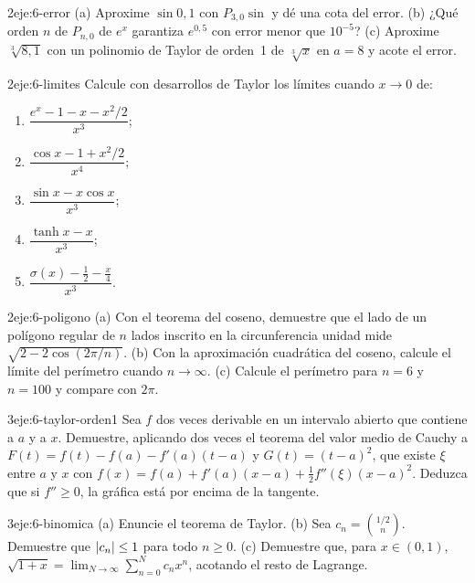 \begin{ejercicio}{2}{eje:6-error}
(a) Aproxime $\sin 0{,}1$ con $P_{3,0}\sin$ y dé una cota del error. (b) ¿Qué orden $n$ de $P_{n,0}$ de $e^{x}$ garantiza $e^{0{,}5}$ con error menor que $10^{-5}$? (c) Aproxime $\sqrt[3]{8{,}1}$ con un polinomio de Taylor de orden~1 de $\sqrt[3]{x}$ en $a=8$ y acote el error.
\end{ejercicio}

\begin{ejercicio}{2}{eje:6-limites}
Calcule con desarrollos de Taylor los límites cuando $x\to0$ de:
\begin{enumerate}[label=(\alph*)]
  \item $\dfrac{e^{x}-1-x-x^{2}/2}{x^{3}}$;
  \item $\dfrac{\cos x-1+x^{2}/2}{x^{4}}$;
  \item $\dfrac{\sin x-x\cos x}{x^{3}}$;
  \item $\dfrac{\tanh x-x}{x^{3}}$;
  \item $\dfrac{\sigma(x)-\tfrac12-\tfrac x4}{x^{3}}$.
\end{enumerate}
\end{ejercicio}

\begin{ejercicio}{2}{eje:6-poligono}
(a) Con el teorema del coseno, demuestre que el lado de un polígono regular de $n$ lados inscrito en la circunferencia unidad mide $\sqrt{2-2\cos(2\pi/n)}$. (b) Con la aproximación cuadrática del coseno, calcule el límite del perímetro cuando $n\to\infty$. (c) Calcule el perímetro para $n=6$ y $n=100$ y compare con $2\pi$.
\end{ejercicio}

\begin{ejercicio}{3}{eje:6-taylor-orden1}
Sea $f$ dos veces derivable en un intervalo abierto que contiene a $a$ y a $x$. Demuestre, aplicando dos veces el teorema del valor medio de Cauchy a $F(t)=f(t)-f(a)-f'(a)(t-a)$ y $G(t)=(t-a)^{2}$, que existe $\xi$ entre $a$ y $x$ con $f(x)=f(a)+f'(a)(x-a)+\tfrac12f''(\xi)(x-a)^{2}$. Deduzca que si $f''\ge0$, la gráfica está por encima de la tangente.
\end{ejercicio}

\begin{ejercicio}{3}{eje:6-binomica}
(a) Enuncie el teorema de Taylor. (b) Sea $c_n=\binom{1/2}{n}$. Demuestre que $\lvert c_n\rvert\le1$ para todo $n\ge0$. (c) Demuestre que, para $x\in(0,1)$, $\sqrt{1+x}=\lim_{N\to\infty}\sum_{n=0}^{N}c_nx^{n}$, acotando el resto de Lagrange.
\end{ejercicio}

